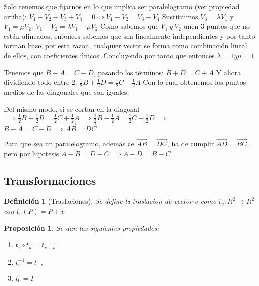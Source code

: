 \documentclass[11pt, a4paper, titlepage]{article}
\makeatletter
\renewenvironment{proof}[1][\proofname] {\vspace{-15pt}\par\pushQED{\qed}\normalfont\topsep6\p@\@plus6\p@\relax\trivlist\item[\hskip\labelsep\it#1\@addpunct{.}]\ignorespaces}{\popQED\endtrivlist\@endpefalse}
\theoremstyle{theorem-style}
\newtheorem*{nprop}{Proposición}
\theoremstyle{definition-style}
\newtheorem*{ndef}{Definición}
\theoremstyle{remark-style}
\theoremstyle{example-style}
\newenvironment{nlist}
{\begin{enumerate}
\renewcommand\labelenumi{(\emph{\roman{enumi})}}}
{\end{enumerate}}
\makeatother
\begin{document}
\begin{proof}\hfill
	Solo tenemos que fijarnos en lo que implica ser paralelogramo (ver propiedad arriba):
	$V_{1} - V_{2} - V_{3} + V_{4} = 0 \Leftrightarrow V_{1} - V_{2} = V_{3} - V_{4} $
	Sustituimos $V_{3} = \lambda V_{1}$ y $V_{4} = \mu V_{2}$:
	$V_{1} - V_{2} = \lambda V_{1} - \mu V_{2}$
	Como sabemos que $V_{1}\ y\ V_{2}$ unen 3 puntos que no están alineados, entonces sabemos que son linealmente independientes y por
	tanto forman base, por esta razon, cualquier vector se forma como combinación lineal de ellos, con coeficientes únicos.
	Concluyendo por tanto que entonces $\lambda = 1 y \mu = 1$

	Tenemos que $B - A = C - D$, pasando los términos:
	$B + D = C + A$
	Y ahora dividiendo todo entre 2:
	$\frac{1}{2}B + \frac{1}{2}D = \frac{1}{2}C + \frac{1}{2}A$
	Con lo cual obtenemos los puntos medios de las diagonales que son iguales.

	 Del mismo modo, si se cortan en la diagonal 
	$\implies \frac{1}{2}B + \frac{1}{2}D = \frac{1}{2}C + \frac{1}{2}A \implies 
	\frac{1}{2}B - \frac{1}{2}A = \frac{1}{2}C - \frac{1}{2}D \implies $ $B - A = C - D \implies \vec{AB} = \vec{DC}$
	
	 Para que sea un paralelogramo, además de $\vec{AB} = \vec{DC}$, ha de cumplir $\vec{AD} = \vec{BC}$, pero por hipotesis $A - B = D - C \implies A - D = B - C$
	
\end{proof}

\subsection{Transformaciones}

\begin{ndef}[Traslaciones]
	Se define la traslacion de vector $v$ como $t_v: R^2 \rightarrow R^2$ con $t_v(P) = P + v$
\end{ndef}

\begin{nprop}
	Se dan las siguientes propiedades:
\begin{nlist}
	\item $t_v \circ t_w = t_{v+w}$
	\item $t_{v}^{-1} = t_{-v}$
	\item $t_0 = I$
\end{nlist}
\end{nprop}
\end{document}
